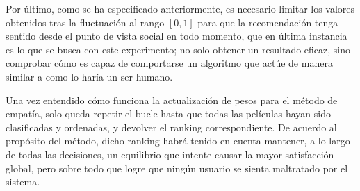Por último, como se ha especificado anteriormente, es necesario limitar los valores obtenidos tras la fluctuación al rango $[0,1]$ para que la recomendación tenga sentido desde el punto de vista social en todo momento, que en última instancia es lo que se busca con este experimento; no solo obtener un resultado eficaz, sino comprobar cómo es capaz de comportarse un algoritmo que actúe de manera similar a como lo haría un ser humano.

Una vez entendido cómo funciona la actualización de pesos para el método de empatía, solo queda repetir el bucle hasta que todas las películas hayan sido clasificadas y ordenadas, y devolver el ranking correspondiente. De acuerdo al propósito del método, dicho ranking habrá tenido en cuenta mantener, a lo largo de todas las decisiones, un equilibrio que intente causar la mayor satisfacción global, pero sobre todo que logre que ningún usuario se sienta maltratado por el sistema.